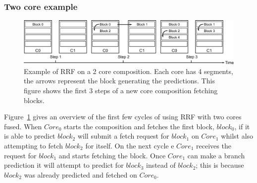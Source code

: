 \subsubsection{Two core example}
	
\begin{figure}[t]
    \centering
    \includegraphics[width=1\textwidth]{chapter3/graphics/fetching-model.pdf}

    \caption{Example of RRF on a 2 core composition. Each core has 4 segments, the arrows represent the block generating the predictions. This figure shows the first 3 steps of a new core composition fetching blocks.}
    \label{fig:new_fetch_ex}
\vspace{1em}
	\end{figure}
Figure~\ref{fig:new_fetch_ex} gives an overview of the first few cycles of using RRF with two cores fused.
When $Core_0$ starts the composition and fetches the first block, $block_0$, if it is able to predict $block_2$ will submit a fetch request for $block_1$ on $Core_1$ whilst also attempting to fetch $block_2$ for itself.
On the next cycle	e $Core_1$ receives the request for $block_1$ and starts fetching the block.
Once $Core_1$ can make a branch prediction it will attempt to predict for $block_3$ instead of $block_2$; this is because $block_2$ was already predicted and fetched on $Core_0$.



